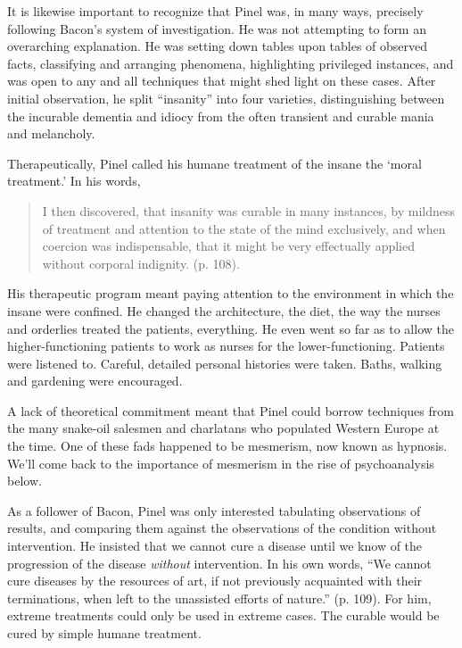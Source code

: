 It is likewise important to recognize that Pinel was, in many ways, precisely following Bacon's system of investigation. He was not attempting to form an overarching explanation. He was setting down tables upon tables of observed facts, classifying and arranging phenomena, highlighting privileged instances, and was open to any and all techniques that might shed light on these cases. After initial observation, he split “insanity” into four varieties, distinguishing between the incurable dementia and idiocy from the often transient and curable mania and melancholy.

Therapeutically, Pinel called his humane treatment of the insane the `moral treatment.' In his words,

\begin{quote}

I then discovered, that insanity was curable in many instances, by mildness of treatment and attention to the state of the mind exclusively, and when coercion was indispensable, that it might be very effectually applied without corporal indignity. (p. 108).
\end{quote}

His therapeutic program meant paying attention to the environment in which the insane were confined. He changed the architecture, the diet, the way the nurses and orderlies treated the patients, everything. He even went so far as to allow the higher-functioning patients to work as nurses for the lower-functioning. Patients were listened to. Careful, detailed personal histories were taken. Baths, walking and gardening were encouraged.

A lack of theoretical commitment meant that Pinel could borrow techniques from the many snake-oil salesmen and charlatans who populated Western Europe at the time. One of these fads happened to be mesmerism, now known as hypnosis. We’ll come back to the importance of mesmerism in the rise of psychoanalysis below.

As a follower of Bacon, Pinel was only interested tabulating observations of results, and comparing them against the observations of the condition without intervention. He insisted that we cannot cure a disease until we know of the progression of the disease \emph{without} intervention. In his own words, “We cannot cure diseases by the resources of art, if not previously acquainted with their terminations, when left to the unassisted efforts of nature.” (p. 109). For him, extreme treatments could only be used in extreme cases. The curable would be cured by simple humane treatment.

